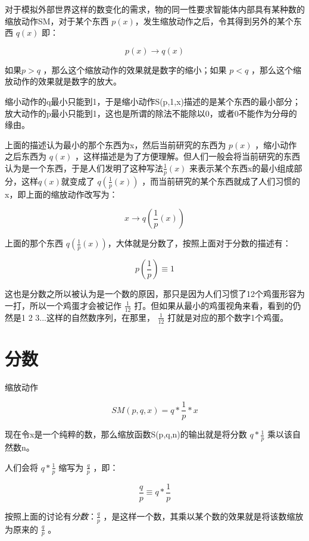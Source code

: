 \documentclass[12pt,oneside]{book}
\begin{document}
对于模拟外部世界这样的数变化的需求，物的同一性要求智能体内部具有某种数的缩放动作SM，对于某个东西 $p(x)$，发生缩放动作之后，令其得到另外的某个东西 $q(x)$ 即：

\[
p(x) \to q(x)   
\]

如果$p>q$ ，那么这个缩放动作的效果就是数字的缩小；如果 $p<q$ ，那么这个缩放动作的效果就是数字的放大。

缩小动作的q最小只能到1，于是缩小动作S(p,1,x)描述的是某个东西的最小部分；放大动作的p最小只能到1，这也是所谓的除法不能除以0，或者0不能作为分母的缘由。

上面的描述认为最小的那个东西为x，然后当前研究的东西为 $p(x)$ ，缩小动作之后东西为 $q(x)$ ，这样描述是为了方便理解。但人们一般会将当前研究的东西认为是一个东西，于是人们发明了这种写法$\frac{1}{p}(x)$ 来表示某个东西x的最小组成部分，这样$q(x)$就变成了 $q(\frac{1}{p}(x))$ ，而当前研究的某个东西就成了人们习惯的x，即上面的缩放动作改写为：


\[
x \to q(\frac{1}{p}(x))  
\]

上面的那个东西 $q(\frac{1}{p}(x))$，大体就是分数了，按照上面对于分数的描述有：

\begin{equation}
p(\frac{1}{p}) \equiv 1
\end{equation}

这也是分数之所以被认为是一个数的原因，那只是因为人们习惯了12个鸡蛋形容为一打，所以一个鸡蛋才会被记作 $\frac{1}{12}$ 打。但如果从最小的鸡蛋视角来看，看到的仍然是1 2 3...这样的自然数序列，在那里， $\frac{1}{12}$ 打就是对应的那个数字1个鸡蛋。



\section{分数}
缩放动作

\begin{equation}
SM(p,q,x) = q* \frac{1}{p} *x
\end{equation}

现在令x是一个纯粹的数，那么缩放函数S(p,q,n)的输出就是将分数 $q* \frac{1}{p}$ 乘以该自然数n。

人们会将 $q* \frac{1}{p}$ 缩写为 $\frac{q}{p}$ ，即：

\begin{equation}
\frac{q}{p} \equiv q* \frac{1}{p}
\end{equation}

按照上面的讨论有\emph{分数}：$\frac{q}{p}$ ，是这样一个数，其乘以某个数的效果就是将该数缩放为原来的 $\frac{q}{p}$ 。
\end{document}
